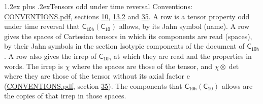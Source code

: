 \documentclass[10pt,a4paper]{article}
\makeatletter
\renewcommand\section{\@startsection{section}{1}{\z@}{-3ex plus -1ex minus -.2ex}%
  {1.2ex plus .2ex}{\normalfont\large\sffamily\bfseries\color{parttitle}}}
\numberwithin{equation}{section}
\newcommand{\grp}[1]{\mathsf{#1}}
\newcommand{\irrprod}{\otimes}
\makeatother
\begin{document}
\section{Tensors odd under time reversal}\label{s:time_odd}
Conventions: \href{../../CONVENTIONS.pdf}{CONVENTIONS.pdf}, sections \href{../../../rotation/CONVENTIONS.pdf\#conv.10}{10}, \href{../../../rotation/CONVENTIONS.pdf\#conv.13.2}{13.2} and \href{../../CONVENTIONS.pdf\#conv.35}{35}.
\leavevmode\label{n:head.name.property}A row is a tensor property odd under time reversal that $\grp{C_{10h}}(\grp{C_{10}})$ allows, by its Jahn symbol (name). \label{n:head.spaces}A row gives the spaces of Cartesian tensors in which its components are read (spaces), by their Jahn symbols in the section Isotypic components of the document of \href{../../../rotation/data/pdf/C10h.pdf}{$\grp{C_{10h}}$}. \label{n:head.properties}A row also gives the irrep of $\grp{C_{10h}}$ at which they are read and the properties in words. The irrep is $\chi$ where the spaces are those of the tensor, and $\chi \irrprod \det$ where they are those of the tensor without its axial factor e (\href{../../CONVENTIONS.pdf}{CONVENTIONS.pdf}, section \href{../../CONVENTIONS.pdf\#conv.35}{35}). The components that $\grp{C_{10h}}(\grp{C_{10}})$ allows are the copies of that irrep in those spaces.
\end{document}
